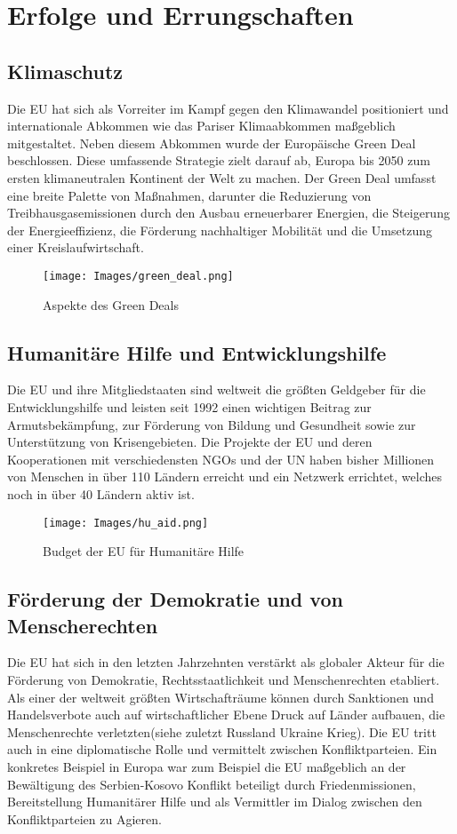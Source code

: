 \documentclass[12pt, oneside]{book} %
\begin{document}
\chapter{Erfolge und Errungschaften}
\section{Klimaschutz}
Die EU hat sich als Vorreiter im Kampf gegen den Klimawandel positioniert und internationale Abkommen wie das Pariser Klimaabkommen maßgeblich mitgestaltet. Neben diesem Abkommen wurde der Europäische Green Deal beschlossen. Diese umfassende Strategie zielt darauf ab, Europa bis 2050 zum ersten klimaneutralen Kontinent der Welt zu machen. Der Green Deal umfasst eine breite Palette von Maßnahmen, darunter die Reduzierung von Treibhausgasemissionen durch den Ausbau erneuerbarer Energien, die Steigerung der Energieeffizienz, die Förderung nachhaltiger Mobilität und die Umsetzung einer Kreislaufwirtschaft.

\begin{figure}[H]
    \centering
    \texttt{[image: Images/green\_deal.png]} 
    \caption{Aspekte des Green Deals}
    \label{fig:green_deal}
\end{figure}



\section{Humanitäre Hilfe und Entwicklungshilfe}
Die EU und ihre Mitgliedstaaten sind weltweit die größten Geldgeber für die Entwicklungshilfe und leisten seit 1992 einen wichtigen Beitrag zur Armutsbekämpfung, zur Förderung von Bildung und Gesundheit sowie zur Unterstützung von Krisengebieten. Die Projekte der EU und deren Kooperationen mit verschiedensten NGOs und der UN haben bisher Millionen von Menschen in über 110 Ländern erreicht und ein Netzwerk errichtet, welches noch in über 40 Ländern aktiv ist.

\begin{figure}[H]
    \centering
    \texttt{[image: Images/hu\_aid.png]} 
    \caption{Budget der EU für Humanitäre Hilfe}
    \label{fig:hu_aid}
\end{figure}

\section{Förderung der Demokratie und von Menscherechten}
Die EU hat sich in den letzten Jahrzehnten verstärkt als globaler Akteur für die Förderung von Demokratie, Rechtsstaatlichkeit und Menschenrechten etabliert. Als einer der weltweit größten Wirtschafträume können durch Sanktionen und Handelsverbote auch auf wirtschaftlicher Ebene Druck auf Länder aufbauen, die Menschenrechte verletzten(siehe zuletzt Russland Ukraine Krieg). Die EU tritt auch in eine diplomatische Rolle und vermittelt zwischen Konfliktparteien. Ein konkretes Beispiel in Europa war zum Beispiel die EU maßgeblich an der Bewältigung des Serbien-Kosovo Konflikt beteiligt durch Friedenmissionen, Bereitstellung Humanitärer Hilfe und als Vermittler im Dialog zwischen den Konfliktparteien zu Agieren. 

\listoffigures
\listoftables

\printbibliography
\end{document}

